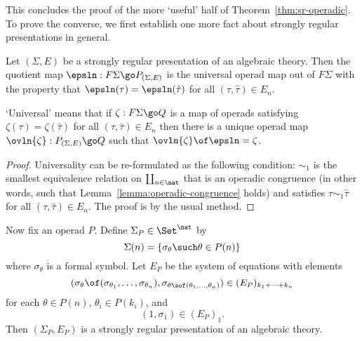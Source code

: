 This concludes the proof of the more `useful' half of
Theorem~\ref{thm:sr-operadic}.  To prove the converse, we first establish
one more fact about strongly regular presentations in general.
%
\begin{lemma}	
Let $(\Sigma,E)$ be a strongly regular presentation of an algebraic
theory.  Then the quotient map $\epsln: F\Sigma \go P_{(\Sigma,E)}$ is the
universal operad map out of $F\Sigma$ with the property that $\epsln(\tau)
= \epsln(\hat{\tau})$ for all $(\tau,\hat{\tau}) \in E_n$.
\end{lemma}
%
`Universal' means that if $\zeta: F\Sigma \go Q$ is a map of operads
satisfying $\zeta(\tau) = \zeta(\hat{\tau})$ for all $(\tau,\hat{\tau}) \in
E_n$ then there is a unique operad map $\ovln{\zeta}: P_{(\Sigma,E)} \go Q$
such that $\ovln{\zeta} \of \epsln = \zeta$.
%
\begin{proof}
Universality can be re-formulated as the following condition: $\sim_1$ is
the smallest equivalence relation on $\coprod_{n\in\nat}$ that is an
operadic congruence (in other words, such that
Lemma~\ref{lemma:operadic-congruence} holds) and satisfies $\tau \sim_1
\hat{\tau}$ for all $(\tau,\hat{\tau}) \in E_n$.  The proof is by the usual
method.  \done
\end{proof}

Now fix an operad $P$.  Define $\Sigma_P \in \Set^\nat$ by
\[
\Sigma(n) = \{\sigma_\theta \such \theta\in P(n) \}
\]
where $\sigma_\theta$ is a formal symbol.  Let $E_P$ be the system of
equations with elements
\[
(\sigma_\theta \of (\sigma_{\theta_1}, \ldots, \sigma_{\theta_n}),
\sigma_{\theta\sof (\theta_1, \ldots, \theta_n)})
\in 
(E_P)_{k_1 + \cdots + k_n}
\]
for each $\theta\in P(n)$, $\theta_i \in P(k_i)$, and 
\[
(1, \sigma_1) \in (E_P)_1.
\]
Then $(\Sigma_P, E_P)$ is a strongly regular presentation of an algebraic
theory. 

